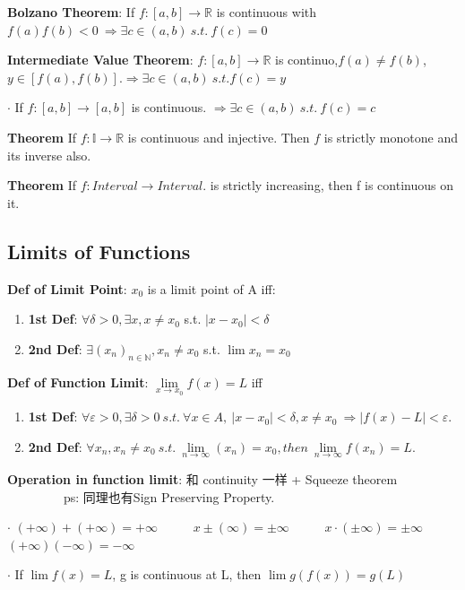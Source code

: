 \documentclass[11pt]{article}
\begin{document}
\textbf{Bolzano Theorem}: If $f:[a,b]\to\mathbb{R}$ is continuous with $f(a)f(b)<0 \ \Rightarrow\exists c\in (a,b) \ s.t. \ f(c)=0$

\textbf{Intermediate Value Theorem}: $f:[a,b]\to\mathbb{R}$ is continuo,$f(a)\ne f(b)$, $y\in[f(a),f(b)]$.$\Rightarrow \exists c\in(a,b) \ s.t. f(c)=y$

$\cdot$ If $f:[a,b]\to [a,b]$ is continuous. $\Rightarrow \exists c\in(a,b) \ s.t. \ f(c)=c$

\textbf{Theorem} If $f:\mathbb{I}\to\mathbb{R}$ is continuous and injective. Then $f$ is strictly monotone and its inverse also.

\textbf{Theorem} If $f: Interval \to Interval$. is strictly increasing, then f is continuous on it.

\subsection{Limits of Functions}

\textbf{Def of Limit Point}: $x_0$ is a limit point of A iff: 
\begin{enumerate}[itemsep=-2pt, topsep=-2pt]
    \item \textbf{1st Def}: $\forall \delta>0,\exists x,x\ne x_0$ s.t. $|x-x_0|<\delta$
    \item \textbf{2nd Def}: $\exists (x_n)_{n\in\mathbb{N}},x_n\ne x_0$ s.t. $\lim x_n=x_0$
\end{enumerate}

\textbf{Def of Function Limit}: $\lim\limits_{x\to x_0}f(x)=L$ iff 
\begin{enumerate}[itemsep=-2pt, topsep=-2pt]
    \item \textbf{1st Def}: $\forall\varepsilon>0,\exists\delta>0 \ s.t. \ \forall x \in A, \ |x-x_0|<\delta,x\ne x_0 \ \Rightarrow |f(x)-L|<\varepsilon.$
    \item \textbf{2nd Def}: $\forall x_n,x_n\ne x_0 \ s.t. \ \lim\limits_{n\to\infty}(x_n)=x_0, then \ \lim\limits_{n\to\infty} f(x_n)=L$.
\end{enumerate}

\textbf{Operation in function limit}: 和 continuity 一样 + Squeeze theorem \ \ \ \ \ \ \ \ \ ps: 同理也有Sign Preserving Property.

$\cdot$ $(+\infty)+(+\infty)=+\infty$ \ \ \ \ \ $x \pm (\infty)=\pm \infty$ \ \ \ \ \ $x \cdot (\pm\infty)=\pm \infty$ \ \ \ \ \ $(+\infty)(-\infty)=-\infty$

$\cdot$ If $\lim f(x)=L$, g is continuous at L, then $\lim g(f(x))=g(L)$
\end{document}
